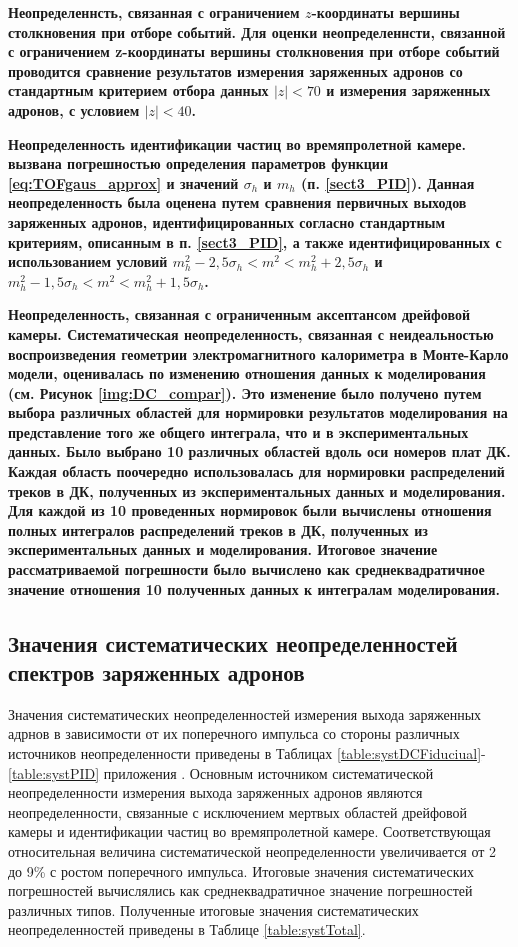 \bfseries Неопределеннсть, связанная с ограничением $z$-координаты вершины столкновения при отборе событий. 
\mdseries
Для оценки неопределеннсти, связанной с ограничением z-координаты вершины столкновения при отборе событий проводится сравнение результатов измерения заряженных адронов со стандартным критерием отбора данных $|z|<70$ и измерения заряженных адронов, с условием $|z|<40$. 

\bfseries Неопределенность идентификации частиц во времяпролетной камере.
\mdseries
вызвана погрешностью определения параметров функции \ref{eq:TOFgaus_approx} и значений  $\sigma_h$ и $m_h$ (п. \ref{sect3_PID}). Данная неопределенность была оценена путем сравнения первичных выходов заряженных адронов, идентифицированных согласно стандартным критериям, описанным в п. \ref{sect3_PID}, а также идентифицированных с использованием условий $ m^2_h -2,5\sigma_h < m^2 < m^2_h +2,5\sigma_h $ и  $ m^2_h -1,5\sigma_h < m^2 < m^2_h +1,5\sigma_h $.

\bfseries Неопределенность, связанная с ограниченным аксептансом дрейфовой камеры.
\mdseries
Систематическая неопределенность, связанная с неидеальностью воспроизведения геометрии электромагнитного калориметра в Монте-Карло модели, оценивалась по изменению отношения данных к моделирования (см.  Рисунок \ref{img:DC_compar}). Это изменение было получено путем выбора различных областей для нормировки результатов моделирования на представление того же общего интеграла, что и в экспериментальных данных. Было выбрано 10 различных областей вдоль оси номеров плат ДК. Каждая область поочередно использовалась для нормировки распределений треков в ДК, полученных из экспериментальных данных и моделирования. Для каждой из 10 проведенных нормировок были вычислены отношения полных интегралов распределений треков в ДК, полученных из экспериментальных данных и моделирования. Итоговое значение рассматриваемой погрешности было вычислено как среднеквадратичное значение отношения 10 полученных данных к интегралам моделирования. 

\subsection{Значения систематических неопределенностей спектров заряженных адронов} \label{sect3:SystValues}
Значения систематических неопределенностей измерения выхода заряженных адрнов в зависимости от их поперечного импульса со стороны различных источников неопределенности приведены в Таблицах \ref{table:systDCFiduciual}-\ref{table:systPID} приложения \label{app:A}. Основным источником систематической неопределенности измерения выхода заряженных адронов являются неопределенности, связанные с исключением мертвых областей дрейфовой камеры и идентификации частиц во времяпролетной камере. Соответствующая относительная величина систематической неопределенности увеличивается от 2 до 9\% с ростом поперечного импульса. 
Итоговые значения систематических погрешностей вычислялись как среднеквадратичное значение погрешностей различных типов. Полученные итоговые значения систематических неопределенностей приведены в Таблице \ref{table:systTotal}.

